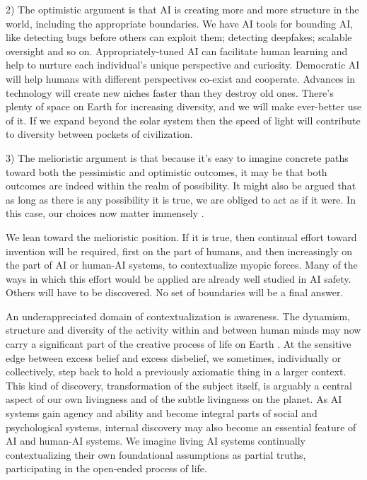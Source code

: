 \documentclass[11pt]{article}
\begin{document}
2) The optimistic argument is that AI is creating more and more structure in the world, including the appropriate boundaries. We have AI tools for bounding AI, like detecting bugs before others can exploit them; detecting deepfakes; scalable oversight and so on. Appropriately-tuned AI can facilitate human learning and help to nurture each individual's unique perspective and curiosity. Democratic AI will help humans with different perspectives co-exist and cooperate. Advances in technology will create new niches faster than they destroy old ones. There's plenty of space on Earth for increasing diversity, and we will make ever-better use of it. If we expand beyond the solar system then the speed of light will contribute to diversity between pockets of civilization.

3) The melioristic argument is that because it's easy to imagine concrete paths toward both the pessimistic and optimistic outcomes, it may be that both outcomes are indeed within the realm of possibility. It might also be argued that as long as there is any possibility it is true, we are obliged to act as if it were. In this case, our choices now matter immensely \citep{ord2020precipice}. 

We lean toward the melioristic position. If it is true, then continual effort toward invention will be required, first on the part of humans, and then increasingly on the part of AI or human-AI systems, to contextualize myopic forces. Many of the ways in which this effort would be applied are already well studied in AI safety. Others will have to be discovered. No set of boundaries will be a final answer. 

An underappreciated domain of contextualization is awareness. The dynamism, structure and diversity of the activity within and between human minds may now carry a significant part of the creative process of life on Earth \citep{popper1972objective, piaget1971biology, aurobindo2005lifedivine, bergson1911creative, boyd2013culturaltechnology}. At the sensitive edge between excess belief and excess disbelief, we sometimes, individually or collectively, step back to hold a previously axiomatic thing in a larger context. This kind of discovery, transformation of the subject itself, is arguably a central aspect of our own livingness and of the subtle livingness on the planet. As AI systems gain agency and ability and become integral parts of social and psychological systems, internal discovery may also become an essential feature of AI and human-AI systems. We imagine living AI systems continually contextualizing their own foundational assumptions as partial truths, participating in the open-ended process of life. 
\end{document}
